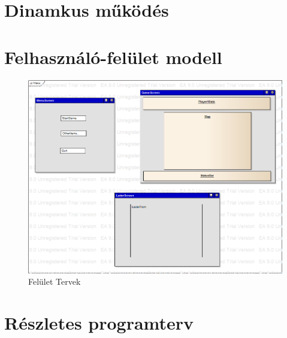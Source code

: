 \documentclass[a4paper,12pt]{report}
\begin{document}
\section{Dinamkus működés}

\section{Felhasználó-felület modell}

\begin{figure}[hbtp]
\centering
\includegraphics[width=1\textwidth]{ViewScreen.png}
\caption{Felület Tervek}
\label{fig:vs}
\end{figure}

\section{Részletes programterv}
\end{document}
